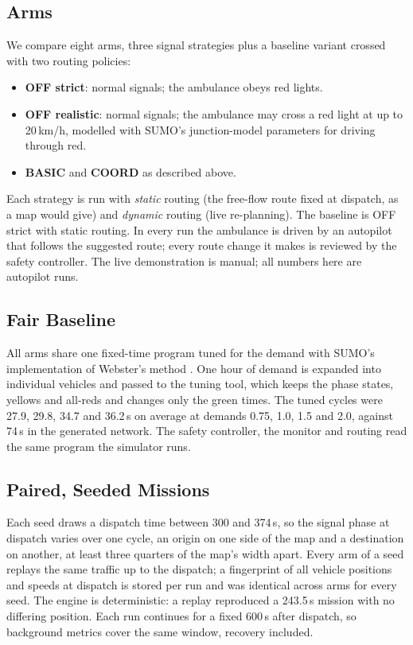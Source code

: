 \documentclass[conference]{IEEEtran}
\begin{document}
\subsection{Arms}

We compare eight arms, three signal strategies plus a baseline variant crossed with two routing policies:
\begin{itemize}
\item \textbf{OFF strict}: normal signals; the ambulance obeys red lights.
\item \textbf{OFF realistic}: normal signals; the ambulance may cross a red light at up to 20\,km/h, modelled with SUMO's junction-model parameters for driving through red.
\item \textbf{BASIC} and \textbf{COORD} as described above.
\end{itemize}
Each strategy is run with \emph{static} routing (the free-flow route fixed at dispatch, as a map would give) and \emph{dynamic} routing (live re-planning). The baseline is OFF strict with static routing. In every run the ambulance is driven by an autopilot that follows the suggested route; every route change it makes is reviewed by the safety controller. The live demonstration is manual; all numbers here are autopilot runs.

\subsection{Fair Baseline}

All arms share one fixed-time program tuned for the demand with SUMO's implementation of Webster's method \cite{webster}. One hour of demand is expanded into individual vehicles and passed to the tuning tool, which keeps the phase states, yellows and all-reds and changes only the green times. The tuned cycles were 27.9, 29.8, 34.7 and 36.2\,s on average at demands 0.75, 1.0, 1.5 and 2.0, against 74\,s in the generated network. The safety controller, the monitor and routing read the same program the simulator runs.

\subsection{Paired, Seeded Missions}

Each seed draws a dispatch time between 300 and 374\,s, so the signal phase at dispatch varies over one cycle, an origin on one side of the map and a destination on another, at least three quarters of the map's width apart. Every arm of a seed replays the same traffic up to the dispatch; a fingerprint of all vehicle positions and speeds at dispatch is stored per run and was identical across arms for every seed. The engine is deterministic: a replay reproduced a 243.5\,s mission with no differing position. Each run continues for a fixed 600\,s after dispatch, so background metrics cover the same window, recovery included.
\end{document}
